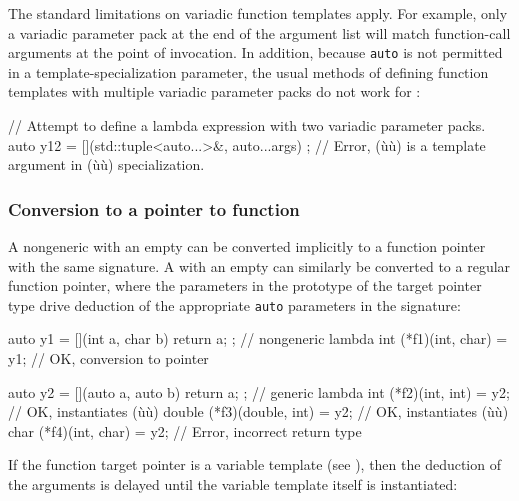 {\noindent The standard limitations on variadic function templates apply. For
example, only a variadic parameter pack at the end of the argument list
will match function-call arguments at the point of invocation. In
addition, because \lstinline!auto! is not permitted in a
template-specialization parameter, the usual methods of defining
function templates with multiple variadic parameter packs do not work
for :

\begin{emcppslisting}
// Attempt to define a lambda expression with two variadic parameter packs.
auto y12 = [](std::tuple<auto...>&, auto...args) { };
    // Error, (ù{}ù) is a template argument in (ù{}ù) specialization.
\end{emcppslisting}
    

\subsubsection[Conversion to a pointer to function]{Conversion to a pointer to function}\label{conversion-to-a-pointer-to-function}

A nongeneric  with an empty  can be converted implicitly to a function pointer with the same
signature. A  with an empty  can similarly be converted to a regular function pointer, where
the parameters in the prototype of the target pointer type drive
deduction of the appropriate \lstinline!auto! parameters in the
 signature:

\begin{emcppslisting}
auto y1 = [](int a, char b) { return a; };   // nongeneric lambda
int (*f1)(int, char) = y1;                   // OK, conversion to pointer

auto y2 = [](auto a, auto b) { return a; };  // generic lambda
int    (*f2)(int, int)    = y2;  // OK, instantiates (ù{}ù)
double (*f3)(double, int) = y2;  // OK, instantiates (ù{}ù)
char   (*f4)(int, char)   = y2;  // Error, incorrect return type
\end{emcppslisting}
    

\noindent If the function target pointer is a variable template (see
), then the deduction of the arguments is
delayed until the variable template itself is instantiated:

}
